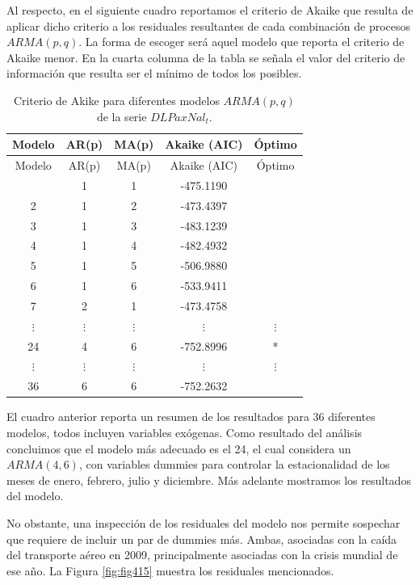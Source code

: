 \documentclass[
]{book}
\begin{document}
Al respecto, en el siguiente cuadro reportamos el criterio de Akaike que resulta de aplicar dicho criterio a los residuales resultantes de cada combinación de procesos \(ARMA(p, q)\). La forma de escoger será aquel modelo que reporta el criterio de Akaike menor. En la cuarta columna de la tabla se señala el valor del criterio de información que resulta ser el mínimo de todos los posibles.

\begin{longtable}[]{@{}ccccc@{}}
\caption{\label{tab:CIARMA} Criterio de Akike para diferentes modelos \(ARMA(p, q)\) de la serie \(DLPaxNal_t\).}\tabularnewline
\toprule\noalign{}
Modelo & AR(p) & MA(p) & Akaike (AIC) & Óptimo \\
\midrule\noalign{}
\endfirsthead
\toprule\noalign{}
Modelo & AR(p) & MA(p) & Akaike (AIC) & Óptimo \\
\midrule\noalign{}
\endhead
\bottomrule\noalign{}
\endlastfoot
1 & 1 & 1 & -475.1190 & \\
2 & 1 & 2 & -473.4397 & \\
3 & 1 & 3 & -483.1239 & \\
4 & 1 & 4 & -482.4932 & \\
5 & 1 & 5 & -506.9880 & \\
6 & 1 & 6 & -533.9411 & \\
7 & 2 & 1 & -473.4758 & \\
\(\vdots\) & \(\vdots\) & \(\vdots\) & \(\vdots\) & \(\vdots\) \\
24 & 4 & 6 & -752.8996 & * \\
\(\vdots\) & \(\vdots\) & \(\vdots\) & \(\vdots\) & \(\vdots\) \\
36 & 6 & 6 & -752.2632 & \\
\end{longtable}

El cuadro anterior reporta un resumen de los resultados para 36 diferentes modelos, todos incluyen variables exógenas. Como resultado del análisis concluimos que el modelo más adecuado es el 24, el cual considera un \(ARMA(4, 6)\), con variables dummies para controlar la estacionalidad de los meses de enero, febrero, julio y diciembre. Más adelante mostramos los resultados del modelo.

No obstante, una inspección de los residuales del modelo nos permite sospechar que requiere de incluir un par de dummies más. Ambas, asociadas con la caída del transporte aéreo en 2009, principalmente asociadas con la crisis mundial de ese año. La Figura \ref{fig:fig415} muestra los residuales mencionados.
\end{document}
